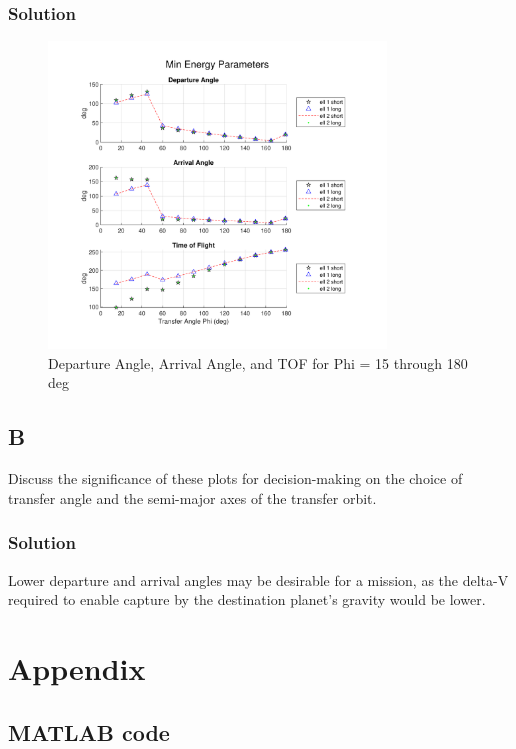 \documentclass[conf]{new-aiaa}
\begin{document}
\subsubsection*{Solution}

\begin{figure}[H]
	\centering 
	\includegraphics[width=0.8\textwidth]{phi15_180.pdf}
	\caption{Departure Angle, Arrival Angle, and TOF for Phi = 15 through 180 deg}
	\label{fig:phi_15_180}
\end{figure}


\subsection*{B}
Discuss the significance of these plots for decision-making on the choice of
transfer angle and the semi-major axes of the transfer orbit.

\subsubsection*{Solution}

Lower departure and arrival angles may be desirable for a mission, as the delta-V required to enable capture by the destination planet's gravity would be lower. 


\newpage
\section*{Appendix} 

\subsection*{MATLAB code} 
\end{document}
